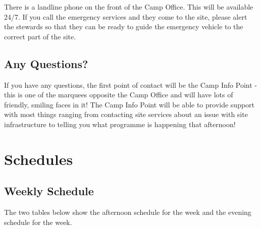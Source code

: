 \documentclass[a4paper, 11pt]{report}
\begin{document}
There is a landline phone on the front of the Camp Office. This will be available 24/7. \nl
If you call the emergency services and they come to the site, please alert the stewards so that they can be ready to guide the emergency vehicle to the correct part of the site. 

\section{Any Questions?}
If you have any questions, the first point of contact will be the Camp Info Point - this is one of the marquees opposite the Camp Office and will have lots of friendly, smiling faces in it!\nl
The Camp Info Point will be able to provide support with most things ranging from contacting site services about an issue with site infrastructure to telling you what programme is happening that afternoon!

\chapter{Schedules}
\section{Weekly Schedule}
The two tables below show the afternoon schedule for the week and the evening schedule for the week.\nl
\end{document}
